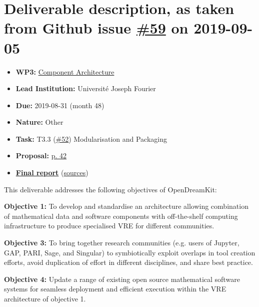 \hypertarget{deliverable-description-as-taken-from-github-issue-59-on-2019-09-05}{%
\section*{\texorpdfstring{Deliverable description, as taken from Github
issue
\href{https://github.com/OpenDreamKit/OpenDreamKit/issues/59}{\#59} on
2019-09-05}{Deliverable description, as taken from Github issue \#59 on 2019-09-05}}\label{deliverable-description-as-taken-from-github-issue-59-on-2019-09-05}}

\begin{itemize}
\tightlist
\item
  \textbf{WP3:}
  \href{https://github.com/OpenDreamKit/OpenDreamKit/tree/master/WP3}{Component
  Architecture}
\item
  \textbf{Lead Institution:} Université Joseph Fourier
\item
  \textbf{Due:} 2019-08-31 (month 48)
\item
  \textbf{Nature:} Other
\item
  \textbf{Task:} T3.3
  (\href{https://github.com/OpenDreamKit/OpenDreamKit/issues/52}{\#52})
  Modularisation and Packaging
\item
  \textbf{Proposal:}
  \href{https://github.com/OpenDreamKit/OpenDreamKit/raw/master/Proposal/proposal-www.pdf}{p.
  42}
\item
  \textbf{\href{https://github.com/OpenDreamKit/OpenDreamKit/raw/master/WP3/D3.10/report-final.pdf}{Final
  report}}
  (\href{https://github.com/OpenDreamKit/OpenDreamKit/raw/master/WP3/D3.10/}{sources})
\end{itemize}

This deliverable addresses the following objectives of OpenDreamKit:

\textbf{Objective 1:} To develop and standardise an architecture
allowing combination of mathematical data and software components with
off-the-shelf computing infrastructure to produce specialised VRE for
different communities.

\textbf{Objective 3:} To bring together research communities (e.g. users
of Jupyter, GAP, PARI, Sage, and Singular) to symbiotically exploit
overlaps in tool creation efforts, avoid duplication of effort in
different disciplines, and share best practice.

\textbf{Objective 4:} Update a range of existing open source
mathematical software systems for seamless deployment and efficient
execution within the VRE architecture of objective 1.


